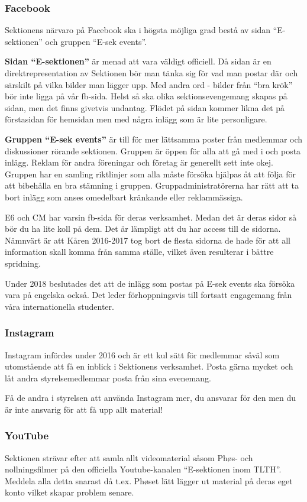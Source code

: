 \documentclass[10pt]{article}
\begin{document}
\subsubsection{Facebook}
Sektionens närvaro på Facebook ska i högsta möjliga grad bestå av sidan ``E-sektionen'' och gruppen ``E-sek events''.

\textbf{Sidan ``E-sektionen''} är menad att vara väldigt officiell. Då sidan är en direktrepresentation av Sektionen bör man tänka sig för vad man postar där och särskilt på vilka bilder man lägger upp. Med andra ord - bilder från ``bra krök'' bör inte ligga på vår fb-sida. Helst så ska olika sektionsevengemang skapas på sidan, men det finns givetvis undantag. Flödet på sidan kommer likna det på förstasidan för hemsidan men med några inlägg som är lite personligare.

\textbf{Gruppen ``E-sek events''} är till för mer lättsamma poster från medlemmar och diskussioner rörande sektionen. Gruppen är öppen för alla att gå med i och posta inlägg. Reklam för andra föreningar och företag är generellt sett inte okej. Gruppen har en samling riktlinjer som alla måste försöka hjälpas åt att följa för att bibehålla en bra stämning i gruppen. Gruppadministratörerna har rätt att ta bort inlägg som anses omedelbart kränkande eller reklammässiga.

E6 och CM har varsin fb-sida för deras verksamhet. Medan det är deras sidor så bör du ha lite koll på dem. Det är lämpligt att du har access till de sidorna. Nämnvärt är att Kåren 2016-2017 tog bort de flesta sidorna de hade för att all information skall komma från samma ställe, vilket även resulterar i bättre spridning.

Under 2018 beslutades det att de inlägg som postas på E-sek events ska försöka vara på engelska också. Det leder förhoppningsvis till fortsatt engagemang från våra internationella studenter.  

\subsubsection{Instagram}
Instagram infördes under 2016 och är ett kul sätt för medlemmar såväl som utomstående att få en inblick i Sektionens verksamhet. Posta gärna mycket och låt andra styrelsemedlemmar posta från sina evenemang.

Få de andra i styrelsen att använda Instagram mer, du ansvarar för den men du är inte ansvarig för att få upp allt material!

\subsubsection{YouTube}
Sektionen strävar efter att samla allt videomaterial såsom Ph\o s- och nollningsfilmer på den officiella Youtube-kanalen ``E-sektionen inom TLTH''. Meddela alla detta snarast då t.ex. Ph\o set lätt lägger ut material på deras eget konto vilket skapar problem senare.
\end{document}
